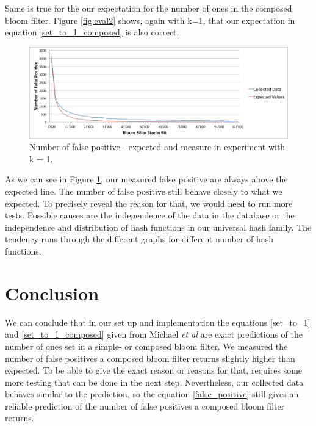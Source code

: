 \documentclass[12]{scrartcl}
\begin{document}
Same is true for the our expectation for the number of ones in the composed bloom filter. Figure \ref{fig:eval2} shows, again with k=1, that our expectation in equation \ref{set_to_1_composed} is also correct.
\begin{figure}[H]
	\begin{center}
		\includegraphics[scale=0.4]{res/1-fp.png}
	\end{center}
	\caption{Number of false positive - expected and measure in experiment with k = 1.}
	\label{fig:eval3}
\end{figure}
As we can see in Figure \ref{fig:eval3}, our measured false positive are always above the expected line. The number of false positive still behave closely to what we expected. To precisely reveal the reason for that, we would need to run more tests. Possible causes are the independence of the data in the database or the independence and distribution of hash functions in our universal hash family. The tendency runs through the different graphs for different number of hash functions.


\section{Conclusion}
We can conclude that in our set up and implementation the equations \ref{set_to_1} and \ref{set_to_1_composed} given from Michael {\em et al}\cite{michael} are exact predictions of the number of ones set in a simple- or composed bloom filter. We measured the number of false positives a composed bloom filter returns slightly higher than expected. To be able to give the exact reason or reasons for that, requires some more testing that can be done in the next step. Nevertheless, our collected data behaves similar to the prediction, so the equation \ref{false_positive} still gives an reliable prediction of the number of false positives a composed bloom filter returns.





\appendix
\end{document}

